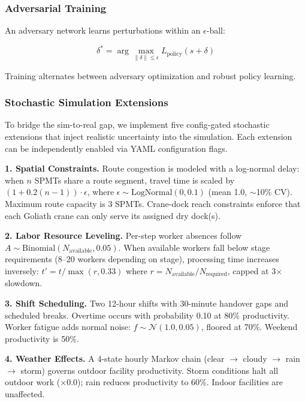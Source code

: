 \documentclass[11pt,a4paper]{article}
\begin{document}
\subsubsection{Adversarial Training}

An adversary network learns perturbations within an $\epsilon$-ball:

\begin{equation}
\delta^* = \arg\max_{\|\delta\| \leq \epsilon} L_{\text{policy}}(s + \delta)
\end{equation}

Training alternates between adversary optimization and robust policy learning.

\subsubsection{Stochastic Simulation Extensions}
\label{sec:stochastic_extensions}

To bridge the sim-to-real gap, we implement five config-gated stochastic extensions that inject realistic uncertainty into the simulation. Each extension can be independently enabled via YAML configuration flags.

\textbf{1. Spatial Constraints.} Route congestion is modeled with a log-normal delay: when $n$ SPMTs share a route segment, travel time is scaled by $(1 + 0.2(n-1)) \cdot \epsilon$, where $\epsilon \sim \text{LogNormal}(0, 0.1)$ (mean 1.0, $\sim$10\% CV). Maximum route capacity is 3 SPMTs. Crane-dock reach constraints enforce that each Goliath crane can only serve its assigned dry dock(s).

\textbf{2. Labor Resource Leveling.} Per-step worker absences follow $A \sim \text{Binomial}(N_{\text{available}}, 0.05)$. When available workers fall below stage requirements (8--20 workers depending on stage), processing time increases inversely: $t' = t / \max(r, 0.33)$ where $r = N_{\text{available}} / N_{\text{required}}$, capped at 3$\times$ slowdown.

\textbf{3. Shift Scheduling.} Two 12-hour shifts with 30-minute handover gaps and scheduled breaks. Overtime occurs with probability 0.10 at 80\% productivity. Worker fatigue adds normal noise: $f \sim \mathcal{N}(1.0, 0.05)$, floored at 70\%. Weekend productivity is 50\%.

\textbf{4. Weather Effects.} A 4-state hourly Markov chain (clear $\rightarrow$ cloudy $\rightarrow$ rain $\rightarrow$ storm) governs outdoor facility productivity. Storm conditions halt all outdoor work ($\times 0.0$); rain reduces productivity to 60\%. Indoor facilities are unaffected.
\end{document}
